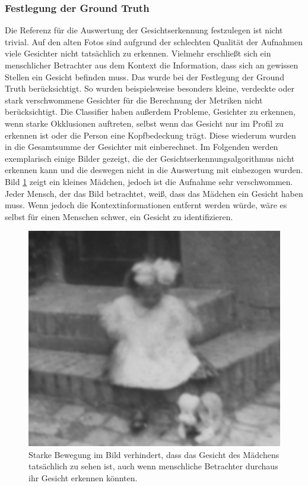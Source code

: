 \subsubsection*{Festlegung der Ground Truth}
Die Referenz für die Auswertung der Gesichtserkennung festzulegen ist nicht trivial. Auf den alten Fotos sind aufgrund der schlechten Qualität der Aufnahmen viele Gesichter nicht tatsächlich zu erkennen. Vielmehr erschließt sich ein menschlicher Betrachter aus dem Kontext die Information, dass sich an gewissen Stellen ein Gesicht befinden muss. Das wurde bei der Festlegung der Ground Truth berücksichtigt. So wurden beispielsweise besonders kleine, verdeckte oder stark verschwommene Gesichter für die Berechnung der Metriken nicht berücksichtigt. Die Classifier haben außerdem Probleme, Gesichter zu erkennen, wenn starke Okklusionen auftreten, selbst wenn das Gesicht nur im Profil zu erkennen ist oder die Person eine Kopfbedeckung trägt. Diese wiederum wurden in die Gesamtsumme der Gesichter mit einberechnet. Im Folgenden werden exemplarisch einige Bilder gezeigt, die der Gesichtserkennungsalgorithmus nicht erkennen kann und die deswegen nicht in die Auswertung mit einbezogen wurden.\\
Bild \ref{fig:neg_ex1} zeigt ein kleines Mädchen, jedoch ist die Aufnahme sehr verschwommen. Jeder Mensch, der das Bild betrachtet, weiß, dass das Mädchen ein Gesicht haben muss. Wenn jedoch die Kontextinformationen entfernt werden würde, wäre es selbst für einen Menschen schwer, ein Gesicht zu identifizieren.\\
\begin{figure}[h]
	\centering
	\includegraphics[width=0.75\linewidth]{images/examples_groundtruth/negative/04_1.png}
	\caption{Starke Bewegung im Bild verhindert, dass das Gesicht des Mädchens tatsächlich zu sehen ist, auch wenn menschliche Betrachter durchaus ihr Gesicht erkennen könnten.}
	\label{fig:neg_ex1}
\end{figure}

